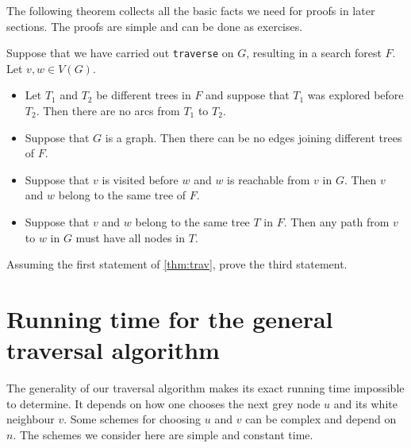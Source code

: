 The following theorem collects all the basic facts we need for proofs
in later sections. The proofs are simple and can be done as exercises. 

\begin{Theorem} \label{thm:trav}
Suppose that we have carried out \texttt{traverse} on $G$, 
resulting in a search forest $F$. Let $v, w \in V(G)$.
\begin{itemize}
  \item Let $T_1$ and $T_2$ be different trees in $F$ and suppose that $T_1$ was explored before $T_2$. 
  Then there are no arcs from $T_1$ to $T_2$. 
  \item Suppose that $G$ is a graph. Then there can be no edges joining different trees of $F$.
  \item Suppose that $v$ is visited before $w$ and $w$ is reachable from $v$ in $G$. 
  Then $v$ and $w$ belong to the same tree of $F$.
  \item Suppose that $v$ and $w$ belong to the same tree $T$ in $F$. 
  Then any path from $v$ to $w$ in $G$ must have all nodes in $T$.
\end{itemize}
\end{Theorem}

\begin{Boxample}[6]
Assuming the first statement of \cref{thm:trav}, prove the third statement.
\end{Boxample}

\section{Running time for the general traversal algorithm}
The generality of our traversal algorithm makes its exact running time impossible to determine.  
It depends on how one chooses the next grey node $u$ and its white neighbour $v$.  
Some schemes for choosing $u$ and $v$ can be complex and depend on $n$. 
The schemes we consider here are simple and constant time.


